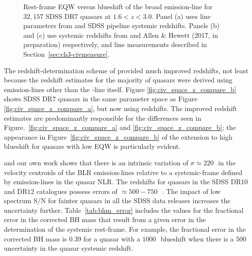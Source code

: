 \begin{figure}
    \caption[{Rest-frame EQW versus blueshift of the broad  emission-line for $32,157$ SDSS DR$7$ quasars at $1.6 < z < 3.0$.}]{Rest-frame EQW versus blueshift of the broad  emission-line for $32,157$ SDSS DR$7$ quasars at $1.6 < z < 3.0$. Panel (a) uses  line parameters from \citet{shen11} and SDSS pipeline systemic redshifts. Panels (b) and (c) use systemic redshifts from \citet{hewett10} and Allen \& Hewett (2017, in preparation) respectively, and  line measurements described in Section~\ref{sec:ch3-civmeasure}.} 
    \label{fig:civ_space_z_compare}
\end{figure}

The redshift-determination scheme of \citet{hewett10} provided much improved redshifts, not least because the redshift estimates for the majority of quasars were derived using emission-lines other than the -line itself. 
Figure \ref{fig:civ_space_z_compare_b} shows SDSS DR$7$ quasars in the same  parameter space as Figure \ref{fig:civ_space_z_compare_a}, but now using \citet{hewett10} redshifts. 
The improved redshift estimates are predominantly responsible for the differences seen in Figure.~\ref{fig:civ_space_z_compare_a} and \ref{fig:civ_space_z_compare_b}; the appearance in Figure~\ref{fig:civ_space_z_compare_b} of the extension to high blueshift for quasars with low  EQW is particularly evident.

\citet{shen16b} and our own work shows that there is an intrinsic variation of $\sigma\simeq220$\,\kms\, in the velocity centroids of the BLR emission-lines relative to a systemic-frame defined by emission-lines in the quasar NLR.
The redshifts for quasars in the SDSS DR$10$ and DR$12$ catalogues \citep{paris14,paris17} possess errors of $\simeq500-750$\,\kms\, \citep{paris12, font-ribera13}. 
The impact of low spectrum S/N for fainter quasars in all the SDSS data releases increases the uncertainty further. 
Table~\ref{tab:bhm_error} includes the values for the fractional error in the corrected BH mass that result from a given error in the determination of the systemic rest-frame. 
For example, the fractional error in the corrected BH mass is $0.39$ for a quasar with a $1000$\,\kms\,  blueshift when there is a $500$\,\kms\, uncertainty in the quasar systemic redshift.   

